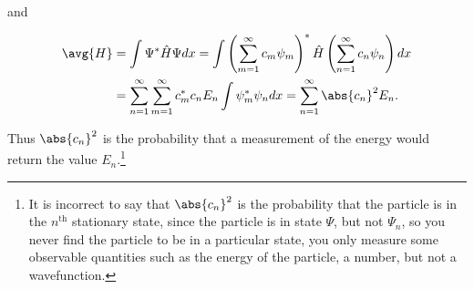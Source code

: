 \documentclass[a4paper,12pt]{report}
\begin{document}
and  

\begin{equation}
  \begin{aligned} 
    \avg{H} &= \int \Psi ^* \hat{H} \Psi dx = \int \left( \sum_{m=1}^{\infty}c_{m}\psi _{m}   \right) ^*  \hat{H} \left( \sum_{n=1}^{\infty}c_{n}\psi _{n}    \right) dx \\ &= \sum_{n=1}^{\infty}\sum_{m=1}^{\infty}c_{m}^*c_{n}E_{n}\int \psi _{m}^*\psi _{n}dx = \sum_{n=1}^{\infty}\abs{c_{n} }^2E_{n}.          
  \end{aligned} 
\end{equation}

Thus \(\abs{c_{n} }^2 \) is the probability that a measurement of the energy would return the value \(E_{n} \).\footnote{It is incorrect to say that \(\abs{c_{n} }^2\) is the probability that the particle is in the \(n^{\text{th}} \) stationary state, since the particle is in state \(\Psi \), but not \(\Psi _{n} \), so you never find the particle to be in a particular state, you only measure some observable quantities such as the energy of the particle, a number, but not a wavefunction.} 
\end{document}
